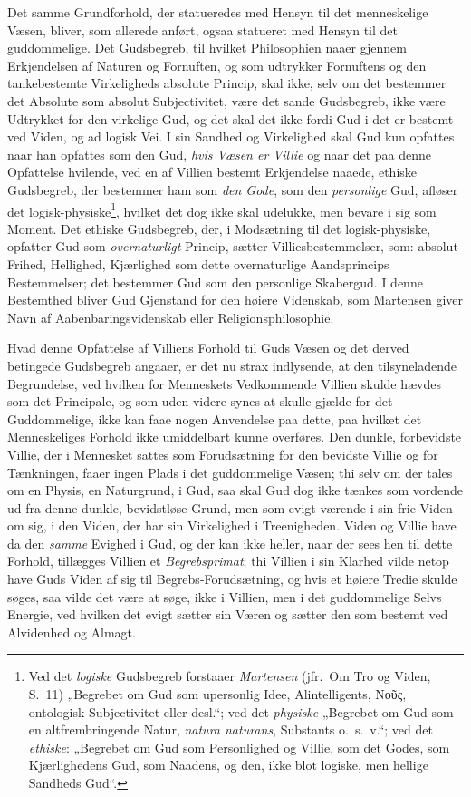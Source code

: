\documentclass[12pt,a4paper]{book}
\newcommand{\opage}[1]{\marginnote{\footnotesize\textit{[#1]}}}
\begin{document}
Det samme Grundforhold, der statueredes med Hensyn til det menneskelige Væsen,
bliver, som allerede anført, ogsaa statueret med Hensyn til det guddommelige. Det
Gudsbegreb, til hvilket Philosophien naaer gjennem Erkjendelsen af Naturen og
Fornuften, og som udtrykker Fornuftens og den tankebestemte Virkeligheds absolute
Princip, skal ikke, selv om det bestemmer det Absolute som absolut Subjectivitet,
være det sande Gudsbegreb, ikke være Udtrykket for den virkelige Gud, og det skal
det ikke fordi Gud i det er bestemt ved Viden, og ad logisk Vei. I sin Sandhed og
Virkelighed skal Gud kun opfattes naar han opfattes som den Gud, \emph{hvis Væsen er Villie} og naar det paa denne Opfattelse hvilende, ved en af Villien bestemt
Erkjendelse naaede, ethiske Gudsbegreb, der bestemmer ham som \emph{den Gode}, som den \emph{personlige} Gud, afløser det logisk-physiske\footnote{Ved det \emph{logiske} Gudsbegreb forstaaer \emph{Martensen} (jfr.\ Om Tro og Viden, S.\ 11) „Begrebet om Gud som upersonlig
Idee, Alintelligents, Νοῦς, ontologisk Subjectivitet eller desl.“; ved det \emph{physiske} „Begrebet om Gud som en altfrembringende Natur, \textit{natura naturans},
Substants o.\ s.\ v.“; ved det \emph{ethiske}: „Begrebet om Gud som Personlighed og
Villie, som det Godes, som Kjærlighedens Gud, som Naadens, og den, ikke blot
logiske, men hellige Sandheds Gud“.}, hvilket det dog ikke skal udelukke, men
bevare i sig som Moment. Det ethiske Gudsbegreb, der, i Modsætning til det
logisk-physiske, opfatter Gud som \emph{overnaturligt} Princip, sætter Villiesbestemmelser,
som: absolut Frihed, Hellighed, Kjærlighed som dette overnaturlige Aandsprincips
Bestemmelser; det bestemmer Gud som den personlige Skabergud. I denne Bestemthed
bliver Gud Gjenstand for den \opage{57}høiere Videnskab, som Martensen giver Navn af
Aabenbaringsvidenskab eller Religionsphilosophie.

Hvad denne Opfattelse af Villiens Forhold til Guds Væsen og det derved betingede
Gudsbegreb angaaer, er det nu strax indlysende, at den tilsyneladende Begrundelse,
ved hvilken for Menneskets Vedkommende Villien skulde hævdes som det Principale, og
som uden videre synes at skulle gjælde for det Guddommelige, ikke kan faae nogen
Anvendelse paa dette, paa hvilket det Menneskeliges Forhold ikke umiddelbart kunne
overføres. Den dunkle, forbevidste Villie, der i Mennesket sattes som Forudsætning
for den bevidste Villie og for Tænkningen, faaer ingen Plads i det guddommelige
Væsen; thi selv om der tales om en Physis, en Naturgrund, i Gud, saa skal Gud dog
ikke tænkes som vordende ud fra denne dunkle, bevidstløse Grund, men som evigt
værende i sin frie Viden om sig, i den Viden, der har sin Virkelighed i
Treenigheden. Viden og Villie have da den \emph{samme} Evighed i Gud, og der kan ikke
heller, naar der sees hen til dette Forhold, tillægges Villien et \emph{Begrebsprimat};
thi Villien i sin Klarhed vilde netop have Guds Viden af sig til
Begrebs-Forudsætning, og hvis et høiere Tredie skulde søges, saa vilde det være at
søge, ikke i Villien, men i det guddommelige Selvs Energie, ved hvilken det evigt
sætter sin Væren og sætter den som bestemt ved Alvidenhed og Almagt.
\end{document}

